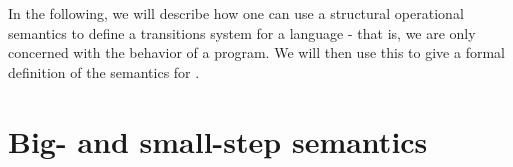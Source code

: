 In the following, we will describe how one can use a structural operational semantics to define a transitions system for a language - that is, we are only concerned with the behavior of a program. We will then use this to give a formal definition of the semantics for \dazel{}.

\section{Big- and small-step semantics}

